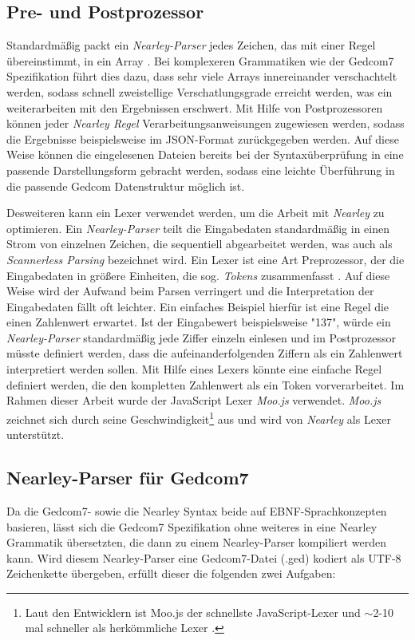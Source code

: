 \subsection{Pre- und Postprozessor}
\label{subsec: Konzept - Gedcom Grammatik - Pre- und Postprozessor}
Standardmäßig packt ein \textit{Nearley-Parser} jedes Zeichen, das mit einer Regel übereinstimmt, in ein Array \cite{NearleyDoc}. Bei komplexeren Grammatiken wie der Gedcom7 Spezifikation führt dies dazu, dass sehr viele Arrays innereinander verschachtelt werden, sodass schnell zweistellige Verschatlungsgrade erreicht werden, was ein weiterarbeiten mit den Ergebnissen erschwert. Mit Hilfe von Postprozessoren können jeder \textit{Nearley Regel} Verarbeitungsanweisungen zugewiesen werden, sodass die Ergebnisse beispielsweise im JSON-Format zurückgegeben werden. Auf diese Weise können die eingelesenen Dateien bereits bei der Syntaxüberprüfung in eine passende Darstellungsform gebracht werden, sodass eine leichte Überführung in die passende Gedcom Datenstruktur möglich ist.

Desweiteren kann ein Lexer verwendet werden, um die Arbeit mit \textit{Nearley} zu optimieren. Ein \textit{Nearley-Parser} teilt die Eingabedaten standardmäßig in einen Strom von einzelnen Zeichen, die sequentiell abgearbeitet werden, was auch als \textit{Scannerless Parsing} bezeichnet wird. Ein Lexer ist eine Art Preprozessor, der die Eingabedaten in größere Einheiten, die sog. \textit{Tokens} zusammenfasst \cite{NearleyDoc}. Auf diese Weise wird der Aufwand beim Parsen verringert und die Interpretation der Eingabedaten fällt oft leichter. Ein einfaches Beispiel hierfür ist eine Regel die einen Zahlenwert erwartet. Ist der Eingabewert beispielsweise "137", würde ein \textit{Nearley-Parser} standardmäßig jede Ziffer einzeln einlesen und im Postprozessor müsste definiert werden, dass die aufeinanderfolgenden Ziffern als ein Zahlenwert interpretiert werden sollen. Mit Hilfe eines Lexers könnte eine einfache Regel definiert werden, die den kompletten Zahlenwert als ein Token vorverarbeitet. Im Rahmen dieser Arbeit wurde der JavaScript Lexer \textit{Moo.js} \cite{MooDoc} verwendet. \textit{Moo.js} zeichnet sich durch seine Geschwindigkeit\footnote{Laut den Entwicklern ist Moo.js der schnellste JavaScript-Lexer und $\sim$2-10 mal schneller als herkömmliche Lexer \cite{MooDoc}.} aus und wird von \textit{Nearley} als Lexer unterstützt. 

\subsection{Nearley-Parser für Gedcom7}
\label{subsec: Konzept - Gedcom Grammatik - Nearley-Parser für Gedcom7}
Da die Gedcom7- sowie die Nearley Syntax beide auf EBNF-Sprachkonzepten basieren, lässt sich die Gedcom7 Spezifikation ohne weiteres in eine Nearley Grammatik übersetzten, die dann zu einem Nearley-Parser kompiliert werden kann. Wird diesem Nearley-Parser eine Gedcom7-Datei (.ged) kodiert als UTF-8 Zeichenkette übergeben, erfüllt dieser die folgenden zwei Aufgaben: 


